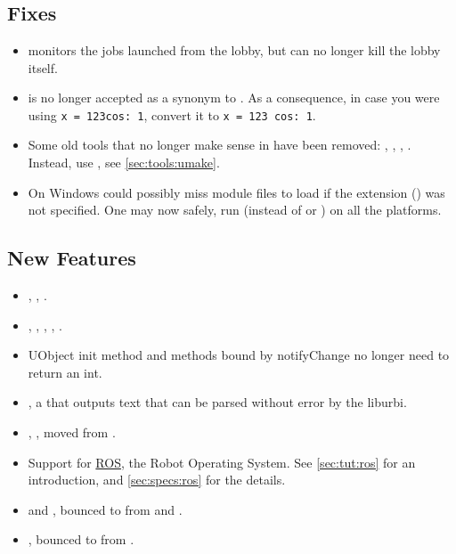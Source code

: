 \section{}

\subsection{Fixes}
\begin{itemize}
\item {} monitors the jobs launched from the
  lobby, but can no longer kill the lobby itself.
\item {} is no longer accepted as a synonym to .
  As a consequence, in case you were using \lstinline|x = 123cos: 1|,
  convert it to \lstinline|x = 123 cos: 1|.
\item Some old tools that no longer make sense in  have been
  removed: , ,
  , .  Instead, use
  , see \autoref{sec:tools:umake}.
\item On Windows  could possibly miss module files to
  load if the extension () was not specified.  One may now
  safely, run  (instead of  or ) on all the platforms.
\end{itemize}

\subsection{New Features}
\begin{itemize}
\item {}, ,
  .
\item {}, ,
  , ,
  .
\item UObject init method and methods bound by notifyChange no longer need
  to return an int.
\item {}, a  that outputs text
  that can be parsed without error by the liburbi.
\item {}, , moved from
  .
\item Support for \href{http://www.ros.org}{ROS}, the Robot Operating
  System.  See \autoref{sec:tut:ros} for an introduction, and
  \autoref{sec:specs:ros} for the details.
\item {} and , bounced to from
   and .
\item {}, bounced to from .
\end{itemize}

